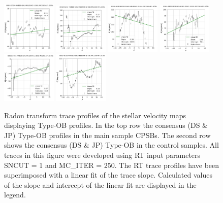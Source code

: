 \documentclass[fleqn,usenatbib]{mnras}
\begin{document}
\begin{figure}
    \centering
    \includegraphics[width=0.23\textwidth]{Images/LINFITS/CPSB-8082-3704-LINFIT-EBARS-MASKED.png}
    \includegraphics[width=0.23\textwidth]{Images/LINFITS/CPSB-8313-6101-LINFIT-EBARS-MASKED.png}
    \includegraphics[width=0.23\textwidth]{Images/LINFITS/CPSB-8938-6102-LINFIT-EBARS-MASKED.png}
    \includegraphics[width=0.23\textwidth]{Images/LINFITS/CPSB-8944-1902-LINFIT-EBARS-MASKED.png}
    \includegraphics[width=0.23\textwidth]{Images/LINFITS/CC0-8262-3703-LINFIT-EBARS-MASKED.png}
    \includegraphics[width=0.23\textwidth]{Images/LINFITS/CC1-9002-6103-LINFIT-EBARS-MASKED.png}
    \caption{Radon transform trace profiles of the stellar velocity maps displaying Type-OB profiles. In the top row the consensus (DS \& JP) Type-OB profiles in the main sample CPSBs. The second row shows the consensus (DS \& JP) Type-OB in the control samples. 
    All traces in this figure were developed using RT input parameters SNCUT = 1 and MC\_ITER = 250. The RT trace profiles have been superimposed with a linear fit of the trace slope. Calculated values of the slope and intercept of the linear fit are displayed in the legend.}
    \label{fig:Radon-traces-Consensus-TYPE-OB-LINFITS}
\end{figure}
\end{document}
